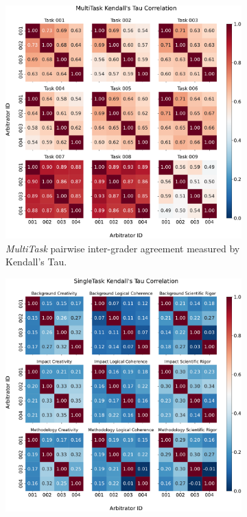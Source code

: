 \begin{figure}[h]
  \vspace{0.5em} %

  \begin{subfigure}[b]{0.49\textwidth}
    \includegraphics[width=\linewidth]{figures/arbitrator_analysis/multitask_ranking_kendall.pdf}
    \caption{\footnotesize \emph{MultiTask} pairwise inter-grader agreement measured by Kendall’s Tau.}
    \label{fig:sub3}
  \end{subfigure}
  \hfill
  \begin{subfigure}[b]{0.49\textwidth}
    \includegraphics[width=\linewidth]{figures/arbitrator_analysis/singletask_ranking_kendall.pdf}

\end{subfigure}
\end{figure}
